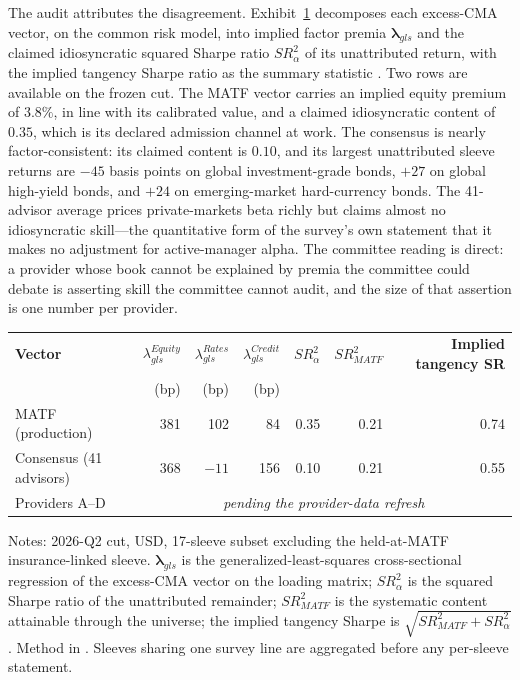 \documentclass[pdftex,12pt,a4paper]{article}
\begin{document}
The audit attributes the disagreement. Exhibit~\ref{tab:provider_decomposition} decomposes each excess-CMA vector, on the common risk model, into implied factor premia $\boldsymbol\lambda_{gls}$ and the claimed idiosyncratic squared Sharpe ratio $SR^2_{\alpha}$ of its unattributed return, with the implied tangency Sharpe ratio as the summary statistic \citep{SeppKastenholzFAJ2026}. Two rows are available on the frozen cut. The MATF vector carries an implied equity premium of $3.8\%$, in line with its calibrated value, and a claimed idiosyncratic content of $0.35$, which is its declared admission channel at work. The consensus is nearly factor-consistent: its claimed content is $0.10$, and its largest unattributed sleeve returns are $-45$ basis points on global investment-grade bonds, $+27$ on global high-yield bonds, and $+24$ on emerging-market hard-currency bonds. The 41-advisor average prices private-markets beta richly but claims almost no idiosyncratic skill---the quantitative form of the survey's own statement that it makes no adjustment for active-manager alpha. The committee reading is direct: a provider whose book cannot be explained by premia the committee could debate is asserting skill the committee cannot audit, and the size of that assertion is one number per provider.

\begin{table}[H]
	\label{tab:provider_decomposition}\vspace*{-0.5\baselineskip}
	\begin{center}
		\footnotesize
		\begin{tabular}{l rrr rrr}
			\toprule
			\textbf{Vector} & $\lambda_{gls}^{Equity}$ & $\lambda_{gls}^{Rates}$ & $\lambda_{gls}^{Credit}$ & $SR^2_{\alpha}$ & $SR^2_{MATF}$ & \textbf{Implied tangency SR} \\
			& (bp) & (bp) & (bp) & & & \\
			\midrule
			MATF (production)  & 381 & 102 & 84  & 0.35 & 0.21 & 0.74 \\
			Consensus (41 advisors) & 368 & $-11$ & 156 & 0.10 & 0.21 & 0.55 \\
			Providers A--D & \multicolumn{6}{c}{\textit{pending the provider-data refresh}} \\
			\bottomrule
		\end{tabular}
	\end{center}
	\vspace*{-0.5\baselineskip}
	{\footnotesize Notes: 2026-Q2 cut, USD, 17-sleeve subset excluding the held-at-MATF insurance-linked sleeve. $\boldsymbol\lambda_{gls}$ is the generalized-least-squares cross-sectional regression of the excess-CMA vector on the loading matrix; $SR^2_{\alpha}$ is the squared Sharpe ratio of the unattributed remainder; $SR^2_{MATF}$ is the systematic content attainable through the universe; the implied tangency Sharpe is $\sqrt{SR^2_{MATF} + SR^2_{\alpha}}$. Method in \citet{SeppKastenholzFAJ2026}. Sleeves sharing one survey line are aggregated before any per-sleeve statement.}
\end{table}
\end{document}
